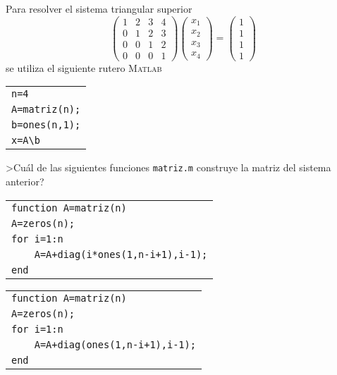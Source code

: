 \begin{pregunta}
\begin{cuerpo}
Para resolver el sistema triangular superior
$$
\left(
\begin{array}{cccc}
1&2&3&4\\
0&1&2&3\\
0&0&1&2\\
0&0&0&1
\end{array}
\right)
\left(
\begin{array}{c}
x_1\\
x_2\\
x_3\\
x_4
\end{array}
\right)
=
\left(
\begin{array}{cccc}
1\\
1\\
1\\
1
\end{array}
\right)
$$
se utiliza el siguiente rutero \textsc{Matlab} \bigskip
\begin{center}
\begin{tabular}{|l|}
\hline
\verb"n=4"\\
\verb"A=matriz(n);"\\
\verb"b=ones(n,1);"\\
\verb"x=A\b"\\
\hline
\end{tabular}
\end{center}
\bigskip
>Cu\'al de las siguientes funciones \verb"matriz.m" construye la matriz del sistema anterior?
\end{cuerpo}
\begin{multicols}{2}
\begin{alternativas}
{\begin{tabular}{|l|}\hline\verb"function A=matriz(n)"\\\verb"A=zeros(n);"\\ \verb"for i=1:n"\\ \verb"    A=A+diag(i*ones(1,n-i+1),i-1);"\\ \verb"end" \\\hline \end{tabular}}
{\begin{tabular}{|l|}\hline\verb"function A=matriz(n)"\\\verb"A=zeros(n);"\\ \verb"for i=1:n"\\ \verb"    A=A+diag(ones(1,n-i+1),i-1);"\\ \verb"end" \\\hline \end{tabular}}

\end{alternativas}
\end{multicols}
\end{pregunta}
